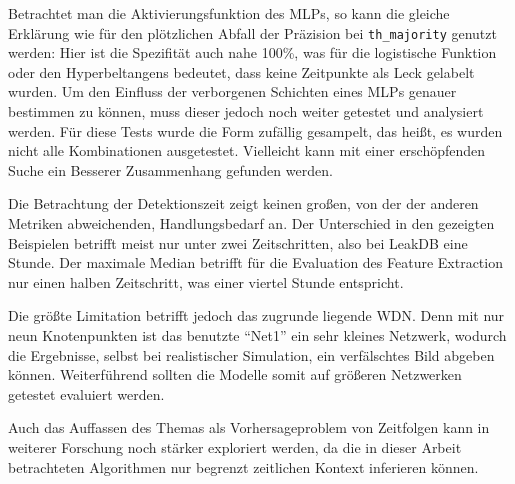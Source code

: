 Betrachtet man die Aktivierungsfunktion des MLPs, so kann die gleiche Erklärung wie für den plötzlichen Abfall
 der Präzision bei \texttt{th\_majority} genutzt werden: Hier ist die Spezifität auch nahe 100\%, was für die
 logistische Funktion oder den Hyperbeltangens bedeutet, dass keine Zeitpunkte als Leck gelabelt wurden. Um
 den Einfluss der verborgenen Schichten eines MLPs genauer bestimmen zu können, muss dieser jedoch noch weiter
 getestet und analysiert werden. Für diese Tests wurde die Form zufällig gesampelt, das heißt, es wurden nicht
 alle Kombinationen ausgetestet. Vielleicht kann mit einer erschöpfenden Suche ein Besserer Zusammenhang
 gefunden werden.

Die Betrachtung der Detektionszeit zeigt keinen großen, von der der anderen Metriken abweichenden,
 Handlungsbedarf an. Der Unterschied in den gezeigten Beispielen betrifft meist nur unter zwei Zeitschritten,
 also bei LeakDB eine Stunde. Der maximale Median betrifft für die Evaluation des Feature Extraction nur einen
 halben Zeitschritt, was einer viertel Stunde entspricht.

Die größte Limitation betrifft jedoch das zugrunde liegende WDN. Denn mit nur neun Knotenpunkten ist das
 benutzte “Net1” ein sehr kleines Netzwerk, wodurch die Ergebnisse, selbst bei realistischer Simulation, ein
 verfälschtes Bild abgeben können. Weiterführend sollten die Modelle somit auf größeren Netzwerken getestet
 evaluiert werden.

Auch das Auffassen des Themas als Vorhersageproblem von Zeitfolgen kann in weiterer Forschung noch stärker
 exploriert werden, da die in dieser Arbeit betrachteten Algorithmen nur begrenzt zeitlichen Kontext inferieren
 können.

